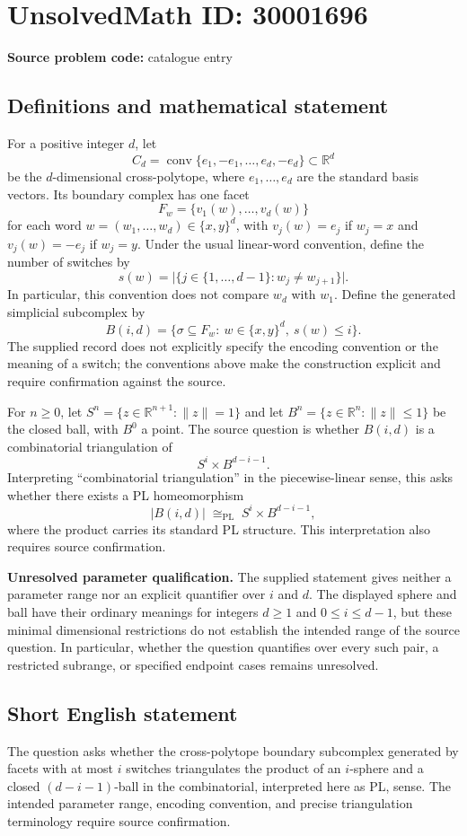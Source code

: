 \documentclass[11pt]{article}
\newcommand{\R}{\mathbb{R}}
\begin{document}
\section*{UnsolvedMath ID: 30001696}
\textbf{Source problem code:} catalogue entry
\subsection{Definitions and mathematical statement}
For a positive integer \(d\), let
\[
C_d=\operatorname{conv}\{e_1,-e_1,\ldots,e_d,-e_d\}\subset\R^d
\]
be the \(d\)-dimensional cross-polytope, where \(e_1,\ldots,e_d\) are the standard basis vectors. Its boundary complex has one facet
\[
F_w=\{v_1(w),\ldots,v_d(w)\}
\]
for each word \(w=(w_1,\ldots,w_d)\in\{x,y\}^d\), with \(v_j(w)=e_j\) if \(w_j=x\) and \(v_j(w)=-e_j\) if \(w_j=y\). Under the usual linear-word convention, define the number of switches by
\[
s(w)=\bigl|\{j\in\{1,\ldots,d-1\}:w_j\ne w_{j+1}\}\bigr|.
\]
In particular, this convention does not compare \(w_d\) with \(w_1\). Define the generated simplicial subcomplex by
\[
B(i,d)=\{\sigma\subseteq F_w:\ w\in\{x,y\}^d,\ s(w)\le i\}.
\]
The supplied record does not explicitly specify the encoding convention or the meaning of a switch; the conventions above make the construction explicit and require confirmation against the source.

For \(n\ge0\), let \(S^n=\{z\in\R^{n+1}:\|z\|=1\}\) and let \(B^n=\{z\in\R^n:\|z\|\le1\}\) be the closed ball, with \(B^0\) a point. The source question is whether \(B(i,d)\) is a combinatorial triangulation of
\[
S^i\times B^{d-i-1}.
\]
Interpreting ``combinatorial triangulation'' in the piecewise-linear sense, this asks whether there exists a PL homeomorphism
\[
|B(i,d)|\;\cong_{\mathrm{PL}}\;S^i\times B^{d-i-1},
\]
where the product carries its standard PL structure. This interpretation also requires source confirmation.

\textbf{Unresolved parameter qualification.} The supplied statement gives neither a parameter range nor an explicit quantifier over \(i\) and \(d\). The displayed sphere and ball have their ordinary meanings for integers \(d\ge1\) and \(0\le i\le d-1\), but these minimal dimensional restrictions do not establish the intended range of the source question. In particular, whether the question quantifies over every such pair, a restricted subrange, or specified endpoint cases remains unresolved.
\subsection{Short English statement}
The question asks whether the cross-polytope boundary subcomplex generated by facets with at most \(i\) switches triangulates the product of an \(i\)-sphere and a closed \((d-i-1)\)-ball in the combinatorial, interpreted here as PL, sense. The intended parameter range, encoding convention, and precise triangulation terminology require source confirmation.
\end{document}
